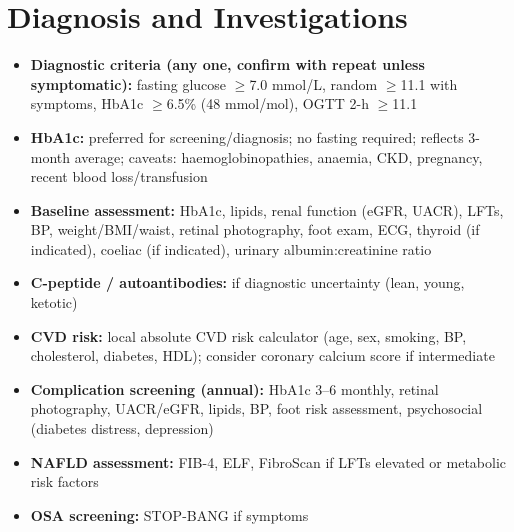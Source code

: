 \section*{Diagnosis and Investigations}
\begin{itemize}
    \item \textbf{Diagnostic criteria (any one, confirm with repeat unless symptomatic):} fasting glucose $\ge$7.0 mmol/L, random $\ge$11.1 with symptoms, HbA1c $\ge$6.5\% (48 mmol/mol), OGTT 2-h $\ge$11.1
    \item \textbf{HbA1c:} preferred for screening/diagnosis; no fasting required; reflects 3-month average; caveats: haemoglobinopathies, anaemia, CKD, pregnancy, recent blood loss/transfusion
    \item \textbf{Baseline assessment:} HbA1c, lipids, renal function (eGFR, UACR), LFTs, BP, weight/BMI/waist, retinal photography, foot exam, ECG, thyroid (if indicated), coeliac (if indicated), urinary albumin:creatinine ratio
    \item \textbf{C-peptide / autoantibodies:} if diagnostic uncertainty (lean, young, ketotic)
    \item \textbf{CVD risk:} local absolute CVD risk calculator (age, sex, smoking, BP, cholesterol, diabetes, HDL); consider coronary calcium score if intermediate
    \item \textbf{Complication screening (annual):} HbA1c 3--6 monthly, retinal photography, UACR/eGFR, lipids, BP, foot risk assessment, psychosocial (diabetes distress, depression)
    \item \textbf{NAFLD assessment:} FIB-4, ELF, FibroScan if LFTs elevated or metabolic risk factors
    \item \textbf{OSA screening:} STOP-BANG if symptoms
\end{itemize}

